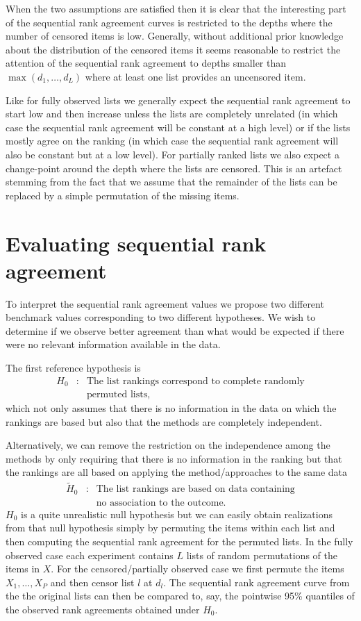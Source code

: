 \documentclass[12pt,a4paper]{article}
\theoremstyle{plain}
\begin{document}
When the two assumptions are satisfied then it is clear that the
interesting part of the sequential rank agreement curves is restricted
to the depths where the number of censored items is
low. Generally, without additional prior knowledge about the
distribution of the censored items it seems reasonable to restrict the
attention of the sequential rank agreement to depths smaller than
$\max(d_1, \ldots, d_L)$ where at least one list provides an
uncensored item.

Like for fully observed lists we generally expect the sequential rank
agreement to start low and then increase unless the lists are
completely unrelated (in which case the sequential rank agreement will
be constant at a high level) or if the lists mostly agree on the
ranking (in which case the sequential rank agreement will also be
constant but at a low level). For partially ranked lists we also
expect a change-point around the depth where the lists are
censored. This is an artefact stemming from the fact that we assume
that the remainder of the lists can be replaced by a simple
permutation of the missing items.

\section{Evaluating sequential rank agreement}

To interpret the sequential rank agreement values we propose two
different benchmark values corresponding to two different
hypotheses. We wish to determine if we observe better agreement than
what would be expected if there were no relevant information available
in the data.

The first reference hypothesis is
\begin{eqnarray*}
H_0  & : &  \text{The list rankings correspond to complete randomly}\\
       &  & \text{permuted lists},
\end{eqnarray*}
which not only assumes that there is no information in the data on
which the rankings are based but also that the methods are completely
independent.

Alternatively, we can remove the restriction on the independence among
the methods by only requiring that there is no information in the
ranking but that the rankings are all based on applying the
method/approaches to the same data
\begin{eqnarray*}
\widetilde H_0 & :&  \text{The list rankings are based on data containing}\\
& &   \text{no association to the outcome.}
\end{eqnarray*}
$H_0$ is a quite unrealistic null hypothesis but we can easily obtain
realizations from that null hypothesis simply by permuting the items
within each list and then computing the sequential rank agreement for
the permuted lists. In the fully observed case each experiment
contains $L$ lists of random permutations of the items in $X$. For the
censored/partially observed case we first permute the items
$X_1,\dots,X_P$ and then censor list $l$ at $d_l$. The sequential rank
agreement curve from the the original lists can then be compared to,
say, the pointwise 95\% quantiles of the observed rank agreements
obtained under $H_0$.
\end{document}
